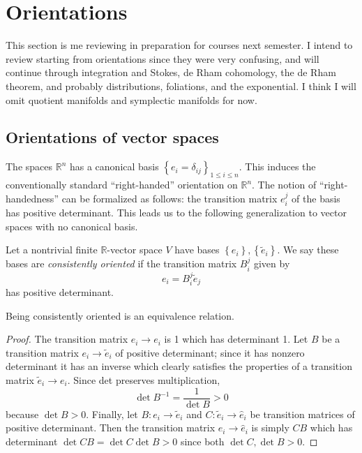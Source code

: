 \chapter{Orientations}



This section is me reviewing in preparation for courses next semester. I intend to review starting from orientations since they were very confusing, and will continue through integration and Stokes, de Rham cohomology, the de Rham theorem, and probably distributions, foliations, and the exponential. I think I will omit quotient manifolds and symplectic manifolds for now.

\section{Orientations of vector spaces}

The spaces $\mathbb{R} ^n$ has a canonical basis $\left\{ e_i=\delta_{ij}  \right\}_{1\leq i\leq n} $. This induces the conventionally standard ``right-handed'' orientation on $\mathbb{R} ^n$. The notion of ``right-handedness'' can be formalized as follows: the transition matrix $e_i^j$ of the basis has positive determinant. This leads us to the following generalization to vector spaces with no canonical basis.

\begin{definition}\label{4.1.1}
	Let a nontrivial finite $\mathbb{R} $-vector space $V$ have bases $\left\{ e_i \right\} ,\left\{ \widetilde{e}_i \right\} $. We say these bases are \emph{consistently oriented} if the transition matrix $B_i^j$ given by
	\[
		e_i=B_i^j \widetilde{e} _j
	\]
	has positive determinant.
\end{definition}

\begin{proposition}\label{4.1.2}
	Being consistently oriented is an equivalence relation.
\end{proposition}
\begin{proof}
	The transition matrix $e_i \to e_i$ is 1 which has determinant 1. Let $B$ be a transition matrix $e_i \to \widetilde{e}_i$ of positive determinant; since it has nonzero determinant it has an inverse which clearly satisfies the properties of a transition matrix $\widetilde{e} _i\to e_i$. Since det preserves multiplication,
	\[
		\det B^{-1} =\frac{1}{\det B} >0
	\]
	because $\det B>0$. Finally, let $B : e_i \to \widetilde{e} _i$ and $C : \widetilde{e}_i \to \hat{e}_i$ be transition matrices of positive determinant. Then the transition matrix $e_i \to \hat{e} _i$ is simply $CB$ which has determinant $\det CB=\det C \det B>0$ since both $\det C,\det B>0$.
\end{proof}

